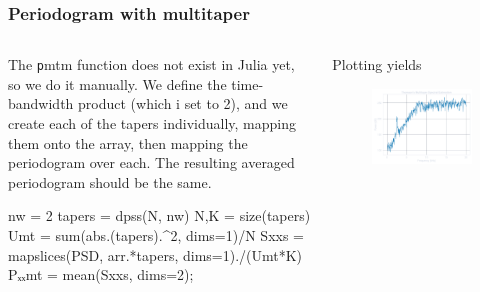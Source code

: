 \documentclass[compress]{beamer}
\begin{document}
\begin{frame}[fragile] %
    \frametitle{Periodogram with multitaper}
    \begin{columns}
        \begin{column}{0.5\textwidth}
            The {\texttt pmtm} function does not exist in Julia yet,
            so we do it manually. We define the time-bandwidth product (which i
            set to 2), and we create each of the tapers individually, mapping
            them onto the array, then mapping the periodogram over each. The
            resulting averaged periodogram should be the same.
            \begin{jllisting}[gobble=16]
                nw = 2
                tapers = dpss(N, nw)
                N,K = size(tapers)
                Umt = sum(abs.(tapers).^2, dims=1)/N
                Sxxs = mapslices(PSD, arr.*tapers, dims=1)./(Umt*K)
                Pₓₓmt = mean(Sxxs, dims=2);
            \end{jllisting}
        \end{column}
        \begin{column}{0.5\textwidth}
            Plotting yields
            \begin{figure}
                \includegraphics[width=\columnwidth]{"../1d.pdf"}
            \end{figure}
        \end{column}
    \end{columns}
\end{frame}
\end{document}
